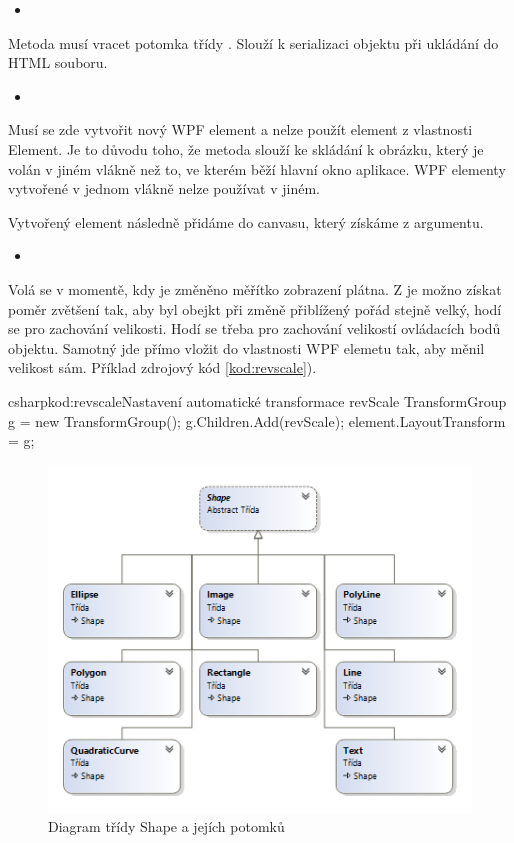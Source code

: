 \documentclass[
  field=inf,
  biblatex,
  glossaries,
  index
]{kidiplom}
\begin{document}
\begin{itemize}
\item {}
\end{itemize}
Metoda musí vracet potomka třídy . Slouží k serializaci objektu při ukládání do HTML souboru.

\begin{itemize}
\item {}
\end{itemize}
Musí se zde vytvořit nový WPF element a nelze použít element z vlastnosti Element. Je to důvodu toho, že metoda slouží ke skládání k obrázku, který je volán v jiném vlákně než to, ve kterém běží hlavní okno aplikace. WPF elementy vytvořené v jednom vlákně nelze používat v jiném.

Vytvořený element následně přidáme do canvasu, který získáme z argumentu.

\begin{itemize}
\item {}
\end{itemize}

Volá se v momentě, kdy je změněno měřítko zobrazení plátna. Z  je možno získat poměr zvětšení tak, aby byl obejkt při změně přiblížený pořád stejně velký, hodí se pro zachování velikosti. Hodí se třeba pro zachování velikostí ovládacích bodů objektu. Samotný  jde přímo vložit do vlastnosti WPF elemetu tak, aby měnil velikost sám. Příklad zdrojový kód \ref{kod:revscale}).

\begin{kicode}{csharp}{kod:revscale}{Nastavení automatické transformace revScale}
TransformGroup g = new TransformGroup();
g.Children.Add(revScale);
element.LayoutTransform = g;
\end{kicode}


\begin{figure}
\includegraphics[width=15cm]{img/shape_diag}
\caption{Diagram třídy Shape a jejích potomků}
\end{figure}  
\end{document}
